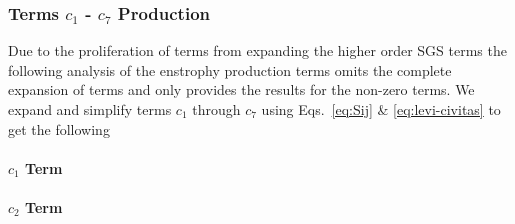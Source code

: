 \subsubsection{Terms $c_{1}$ - $c_{7}$ Production}
Due to the proliferation of terms from expanding the higher order SGS terms the following analysis
of the enstrophy production terms omits the complete expansion of terms and only provides the
results for the non-zero terms.  We expand and simplify terms $c_{1}$
through $c_{7}$ using Eqs.~\ref{eq:Sij} \&
\ref{eq:levi-civitas} to get the following
\paragraph{$c_{1}$ Term}

\paragraph{$c_{2}$ Term}

